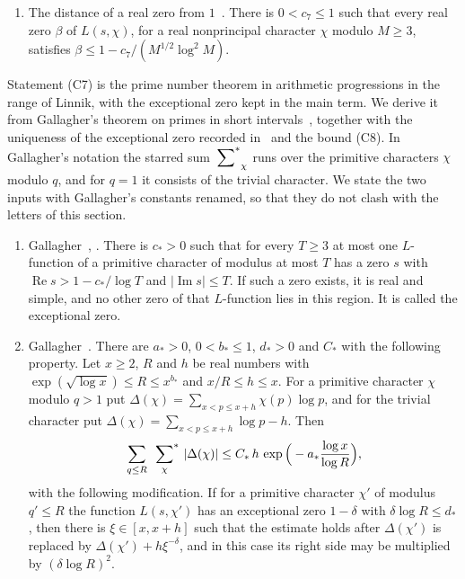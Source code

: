 \begin{enumerate}
\[
\big\lvert\pi(X;M,b)-\mathfrak m(X;M,b)\big\rvert\le A_0'\Big(e^{-c_6\log X/\log M}+e^{-\sqrt{c_6\log X}}\Big)\,\mathfrak m(X;M,b),
\]
where $\mathfrak m(X;M,b)=\big(\operatorname{li}(X)-\chi_1(b)\operatorname{li}(X^{\beta_1})\big)/\varphi(M)$ for the chosen pair, and $\mathfrak m(X;M,b)=\operatorname{li}(X)/\varphi(M)$ when no such pair exists.
\item[(C8)] The distance of a real zero from $1$~\cite[Ch.~14]{davenport}. There is $0<c_7\le1$ such that every real zero $\beta$ of $L(s,\chi)$, for a real nonprincipal character $\chi$ modulo $M\ge3$, satisfies $\beta\le1-c_7/(M^{1/2}\log^2M)$.
\end{enumerate}
Statement (C7) is the prime number theorem in arithmetic progressions in the range of Linnik, with the exceptional zero kept in the main term. We derive it from Gallagher's theorem on primes in short intervals~\cite[Theorem~7]{gallagher}, together with the uniqueness of the exceptional zero recorded in~\cite[Section~4, display~(26)]{gallagher} and the bound (C8). In Gallagher's notation the starred sum $\sideset{}{^\ast}\sum_\chi$ runs over the primitive characters $\chi$ modulo $q$, and for $q=1$ it consists of the trivial character. We state the two inputs with Gallagher's constants renamed, so that they do not clash with the letters of this section.
\begin{enumerate}
\item[(G1)] Gallagher~\cite[Section~4, display~(26)]{gallagher}, \cite[Ch.~14]{davenport}. There is $c_\ast>0$ such that for every $T\ge3$ at most one $L$-function of a primitive character of modulus at most $T$ has a zero $s$ with $\operatorname{Re}s>1-c_\ast/\log T$ and $\lvert\operatorname{Im}s\rvert\le T$. If such a zero exists, it is real and simple, and no other zero of that $L$-function lies in this region. It is called the exceptional zero.
\item[(G2)] Gallagher~\cite[Theorem~7]{gallagher}. There are $a_\ast>0$, $0<b_\ast\le1$, $d_\ast>0$ and $C_\ast$ with the following property. Let $x\ge2$, $R$ and $h$ be real numbers with $\exp(\sqrt{\log x})\le R\le x^{b_\ast}$ and $x/R\le h\le x$. For a primitive character $\chi$ modulo $q>1$ put $\Delta(\chi)=\sum_{x<p\le x+h}\chi(p)\log p$, and for the trivial character put $\Delta(\chi)=\sum_{x<p\le x+h}\log p-h$. Then
\[
\sum_{q\le R}\ \sideset{}{^\ast}\sum_{\chi}\ \lvert\Delta(\chi)\rvert\le C_\ast\,h\,\exp\Big(-a_\ast\frac{\log x}{\log R}\Big),
\]
with the following modification. If for a primitive character $\chi'$ of modulus $q'\le R$ the function $L(s,\chi')$ has an exceptional zero $1-\delta$ with $\delta\log R\le d_\ast$, then there is $\xi\in[x,x+h]$ such that the estimate holds after $\Delta(\chi')$ is replaced by $\Delta(\chi')+h\xi^{-\delta}$, and in this case its right side may be multiplied by $(\delta\log R)^2$.
\end{enumerate}
